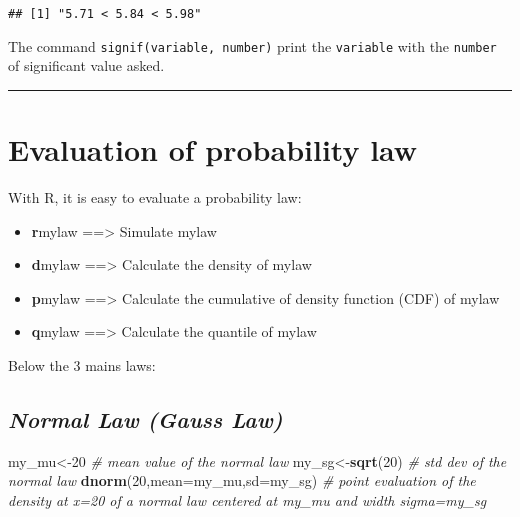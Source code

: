 \documentclass[
]{article}
\newenvironment{Shaded}{\begin{snugshade}}{\end{snugshade}}
\newcommand{\AttributeTok}[1]{\textcolor[rgb]{0.13,0.29,0.53}{#1}}
\newcommand{\CommentTok}[1]{\textcolor[rgb]{0.56,0.35,0.01}{\textit{#1}}}
\newcommand{\DecValTok}[1]{\textcolor[rgb]{0.00,0.00,0.81}{#1}}
\newcommand{\FunctionTok}[1]{\textcolor[rgb]{0.13,0.29,0.53}{\textbf{#1}}}
\newcommand{\NormalTok}[1]{#1}
\newcommand{\OtherTok}[1]{\textcolor[rgb]{0.56,0.35,0.01}{#1}}
\providecommand{\tightlist}{%
  \setlength{\itemsep}{0pt}\setlength{\parskip}{0pt}}
\begin{document}
\begin{verbatim}
## [1] "5.71 < 5.84 < 5.98"
\end{verbatim}

The command \texttt{signif(variable,\ number)} print the
\texttt{variable} with the \texttt{number} of significant value asked.

\begin{center}\rule{0.5\linewidth}{0.5pt}\end{center}

\hypertarget{evaluation-of-probability-law}{%
\section{Evaluation of probability
law}\label{evaluation-of-probability-law}}

With R, it is easy to evaluate a probability law:

\begin{itemize}
\tightlist
\item
  {\textbf{r}}mylaw ==\textgreater{} Simulate mylaw
\item
  {\textbf{d}}mylaw ==\textgreater{} Calculate the density of mylaw
\item
  {\textbf{p}}mylaw ==\textgreater{} Calculate the cumulative of density
  function (CDF) of mylaw
\item
  {\textbf{q}}mylaw ==\textgreater{} Calculate the quantile of mylaw
\end{itemize}

Below the 3 mains laws:

\hypertarget{normal-law-gauss-law}{%
\subsection{\texorpdfstring{\emph{Normal Law (Gauss
Law)}}{Normal Law (Gauss Law)}}\label{normal-law-gauss-law}}

\begin{Shaded}
\begin{Highlighting}[]
\NormalTok{my\_mu}\OtherTok{\textless{}{-}}\DecValTok{20} \CommentTok{\# mean value of the normal law}
\NormalTok{my\_sg}\OtherTok{\textless{}{-}}\FunctionTok{sqrt}\NormalTok{(}\DecValTok{20}\NormalTok{) }\CommentTok{\# std dev of the normal law}
\FunctionTok{dnorm}\NormalTok{(}\DecValTok{20}\NormalTok{,}\AttributeTok{mean=}\NormalTok{my\_mu,}\AttributeTok{sd=}\NormalTok{my\_sg) }\CommentTok{\# point evaluation of the density at x=20 of a normal law centered at my\_mu and width sigma=my\_sg}
\end{Highlighting}
\end{Shaded}
\end{document}
